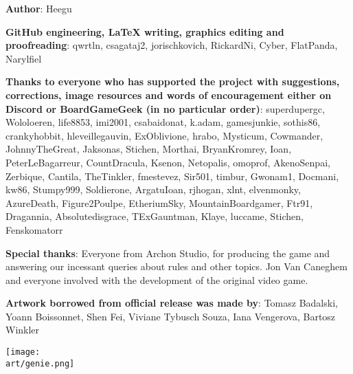 
\bigbreak

\begin{multicols*}{2}

\textbf{Author}: Heegu\par
\textbf{GitHub engineering, LaTeX writing, graphics editing and proofreading}: qwrtln, csagataj2, jorischkovich, RickardNi, Cyber, FlatPanda, Narylfiel\par
\textbf{Thanks to everyone who has supported the project with suggestions, corrections, image resources and words of encouragement either on Discord or BoardGameGeek (in no particular order)}: superdupergc, Wololoeren, life8853, imi2001, csabaidonat, k.adam, gamesjunkie, sothis86, cranky\textunderscore hobbit, hleveillegauvin, ExOblivione, hrabo, Mysticum, Cowmander, JohnnyTheGreat, Jaksonas, Stichen, Morthai, BryanKromrey, Ioan, PeterLeBagarreur, \textunderscore Count\textunderscore Dracula\textunderscore , \space Ksenon, Netopalis, omoprof, AkenoSenpai, Zerbique, Cantila, TheTinkler, fmestevez, Sir501, timbur, Gwonam1, Docmani, kw86, Stumpy999, Soldierone, Argatu\textunderscore Ioan, rj\textunderscore hogan, xlnt, elvenmonky, AzureDeath, Figure2Poulpe, EtheriumSky, MountainBoardgamer, Ftr91, Dragannia, Absolutedisgrace, TExGauntman, Klaye, luccame, Stichen, Fenskomatorr
\par

\textbf{Special thanks}: Everyone from Archon Studio, for producing the game and answering our incessant queries about rules and other topics.
Jon Van Caneghem and everyone involved with the development of the original video game.\par
\textbf{Artwork borrowed from official release was made by}: Tomasz Badalski, Yoann Boissonnet, Shen Fei, Viviane Tybusch Souza, Iana Vengerova, Bartosz Winkler

\columnbreak

\vspace*{\fill}

\texttt{[image: \\art/genie.png]}

\vspace*{\fill}

\end{multicols*}
